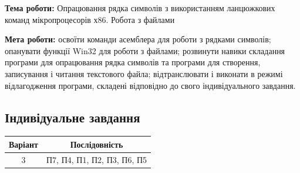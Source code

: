 \documentclass[12pt]{extarticle}
\begin{document}
\textbf{Тема роботи:} Опрацювання рядка символів з використанням ланцюжкових
команд мікропроцесорів х86. Робота з файлами

\vspace{12pt}

\textbf{Мета роботи:} освоїти команди асемблера для роботи з рядками
символів; опанувати функції Win32 для роботи з файлами; розвинути навики
складання програми для опрацювання рядка символів та програми для
створення, записування і читання текстового файла; відтранслювати і виконати
в режимі відлагодження програми, складені відповідно до свого індивідуального
завдання.

\subsection*{Індивідуальне завдання}
\begin{center}
    \begin{tabular}{| c | c |}
        \hline
        Варіант & Послідовність\\
        \hline
           3  & П7, П4, П1, П2, П3, П6, П5\\
        \hline
   
    \end{tabular}
\end{center}
\end{document}
